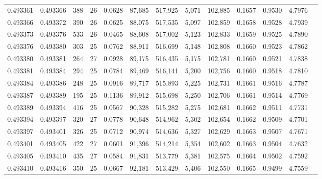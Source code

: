 \begin{tabular}{rrrrrrrrrrrrr}
0.493361 & 0.493366 & 388 &  26 &                                     0.0628 &  87,685 & 517,925 &   5,071 & 102,885 & 0.1657 & 0.9530 & 4.7976 \\
0.493366 & 0.493372 & 390 &  26 &                                     0.0625 &  88,075 & 517,535 &   5,097 & 102,859 & 0.1658 & 0.9528 & 4.7939 \\
0.493373 & 0.493376 & 533 &  26 &                                     0.0465 &  88,608 & 517,002 &   5,123 & 102,833 & 0.1659 & 0.9525 & 4.7890 \\
0.493376 & 0.493380 & 303 &  25 &                                     0.0762 &  88,911 & 516,699 &   5,148 & 102,808 & 0.1660 & 0.9523 & 4.7862 \\
0.493380 & 0.493381 & 264 &  27 &                                     0.0928 &  89,175 & 516,435 &   5,175 & 102,781 & 0.1660 & 0.9521 & 4.7838 \\
0.493381 & 0.493384 & 294 &  25 &                                     0.0784 &  89,469 & 516,141 &   5,200 & 102,756 & 0.1660 & 0.9518 & 4.7810 \\
0.493384 & 0.493386 & 248 &  25 &                                     0.0916 &  89,717 & 515,893 &   5,225 & 102,731 & 0.1661 & 0.9516 & 4.7787 \\
0.493387 & 0.493389 & 195 &  25 &                                     0.1136 &  89,912 & 515,698 &   5,250 & 102,706 & 0.1661 & 0.9514 & 4.7769 \\
0.493389 & 0.493394 & 416 &  25 &                                     0.0567 &  90,328 & 515,282 &   5,275 & 102,681 & 0.1662 & 0.9511 & 4.7731 \\
0.493394 & 0.493397 & 320 &  27 &                                     0.0778 &  90,648 & 514,962 &   5,302 & 102,654 & 0.1662 & 0.9509 & 4.7701 \\
0.493397 & 0.493401 & 326 &  25 &                                     0.0712 &  90,974 & 514,636 &   5,327 & 102,629 & 0.1663 & 0.9507 & 4.7671 \\
0.493401 & 0.493405 & 422 &  27 &                                     0.0601 &  91,396 & 514,214 &   5,354 & 102,602 & 0.1663 & 0.9504 & 4.7632 \\
0.493405 & 0.493410 & 435 &  27 &                                     0.0584 &  91,831 & 513,779 &   5,381 & 102,575 & 0.1664 & 0.9502 & 4.7592 \\
0.493410 & 0.493416 & 350 &  25 &                                     0.0667 &  92,181 & 513,429 &   5,406 & 102,550 & 0.1665 & 0.9499 & 4.7559 \\

\end{tabular}
